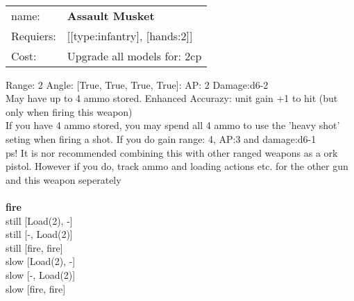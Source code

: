 \ \\
\begin{tabular}{ll}
name: & {\bf Assault Musket } \\
Requiers: & [[type:infantry], [hands:2]] \\
Cost: & Upgrade all models for: 2cp \\
\end{tabular}



Range: 2  Angle: [True, True, True, True]: AP: 2 Damage:d6-2 \\
May have up to 4 ammo stored. Enhanced Accurazy: unit gain +1 to hit (but only when firing this weapon)\\ 
If you have 4 ammo stored, you may spend all 4 ammo to use the 'heavy shot' seting when firing a shot. If you do gain range: 4, AP:3 and damage:d6-1\\ 
 ps! It is nor recommended combining this with other ranged weapons as a ork pistol. However if you do, track ammo and loading actions etc. for the other gun and this weapon seperately\\ 







\ \\ {\bf fire } \\
still [Load(2), -] \\
still [-, Load(2)] \\
still [fire, fire] \\
slow [Load(2), -] \\
slow [-, Load(2)] \\
slow [fire, fire] \\

